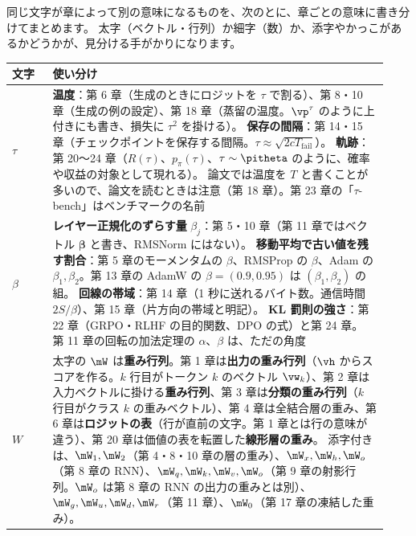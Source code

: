 同じ文字が章によって別の意味になるものを、次のとに、章ごとの意味に書き分けてまとめます。
太字（ベクトル・行列）か細字（数）か、添字やかっこがあるかどうかが、見分ける手がかりになります。

\par\medskip\noindent\begin{minipage}{\linewidth}
\centering\footnotesize
{}
\label{tab:notation-overload}
\begin{tabular}{>{\raggedright\arraybackslash}p{0.10\linewidth}>{\raggedright\arraybackslash}p{0.83\linewidth}}
\toprule
文字 & 使い分け \\
\midrule
$\tau$ & \textbf{温度}：第 6 章（生成のときにロジットを $\tau$ で割る）、第 8・10 章（生成の例の設定）、第 18 章（蒸留の温度。$\vp^\tau$ のように上付きにも書き、損失に $\tau^2$ を掛ける）。
\textbf{保存の間隔}：第 14・15 章（チェックポイントを保存する間隔。$\tau\approx\sqrt{2cT_{\mathrm{fail}}}$）。
\textbf{軌跡}：第 20〜24 章（$R(\tau)$、$p_\pi(\tau)$、$\tau\sim\pitheta$ のように、確率や収益の対象として現れる）。
論文では温度を $T$ と書くことが多いので、論文を読むときは注意（第 18 章）。第 23 章の「$\tau$-bench」はベンチマークの名前 \\
$\beta$ & \textbf{レイヤー正規化のずらす量} $\beta_j$：第 5・10 章（第 11 章ではベクトル $\bm\beta$ と書き、RMSNorm にはない）。
\textbf{移動平均で古い値を残す割合}：第 5 章のモーメンタムの $\beta$、RMSProp の $\beta$、Adam の $\beta_1,\beta_2$。第 13 章の AdamW の $\beta=(0.9,0.95)$ は $(\beta_1,\beta_2)$ の組。
\textbf{回線の帯域}：第 14 章（1 秒に送れるバイト数。通信時間 $2S/\beta$）、第 15 章（片方向の帯域と明記）。
\textbf{KL 罰則の強さ}：第 22 章（GRPO・RLHF の目的関数、DPO の式）と第 24 章。
第 11 章の回転の加法定理の $\alpha$、$\beta$ は、ただの角度 \\
$W$ & 太字の $\mW$ は\textbf{重み行列}。第 1 章は\textbf{出力の重み行列}（$\vh$ からスコアを作る。$k$ 行目がトークン $k$ のベクトル $\vw_k$）、第 2 章は入力ベクトルに掛ける\textbf{重み行列}、第 3 章は\textbf{分類の重み行列}（$k$ 行目がクラス $k$ の重みベクトル）、第 4 章は全結合層の重み、第 6 章は\textbf{ロジットの表}（行が直前の文字。第 1 章とは行の意味が違う）、第 20 章は価値の表を転置した\textbf{線形層の重み}。
添字付きは、$\mW_1,\mW_2$（第 4・8・10 章の層の重み）、$\mW_x,\mW_h,\mW_o$（第 8 章の RNN）、$\mW_q,\mW_k,\mW_v,\mW_o$（第 9 章の射影行列。$\mW_o$ は第 8 章の RNN の出力の重みとは別）、$\mW_g,\mW_u,\mW_d,\mW_r$（第 11 章）、$\mW_0$（第 17 章の凍結した重み）。

\end{tabular}
\end{minipage}
